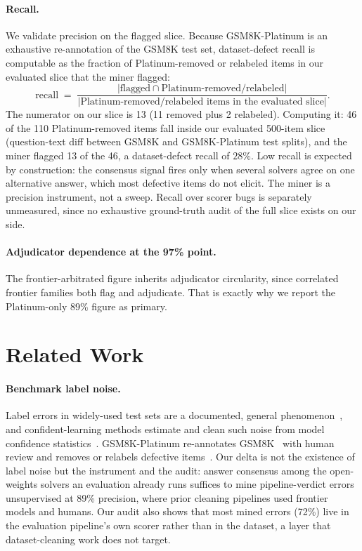\documentclass[11pt]{article}
\begin{document}
\paragraph{Recall.}
We validate precision on the flagged slice.
Because GSM8K-Platinum is an exhaustive re-annotation of the GSM8K test set, dataset-defect recall is computable as the fraction of Platinum-removed or relabeled items in our evaluated slice that the miner flagged:
\[
\text{recall} \;=\; \frac{\lvert \text{flagged} \cap \text{Platinum-removed/relabeled} \rvert}{\lvert \text{Platinum-removed/relabeled items in the evaluated slice} \rvert}.
\]
The numerator on our slice is 13 (11 removed plus 2 relabeled).
Computing it: 46 of the 110 Platinum-removed items fall inside our evaluated 500-item slice (question-text diff between GSM8K and GSM8K-Platinum test splits), and the miner flagged 13 of the 46, a dataset-defect recall of $28\%$.
Low recall is expected by construction: the consensus signal fires only when several solvers agree on one alternative answer, which most defective items do not elicit.
The miner is a precision instrument, not a sweep.
Recall over scorer bugs is separately unmeasured, since no exhaustive ground-truth audit of the full slice exists on our side.

\paragraph{Adjudicator dependence at the 97\% point.}
The frontier-arbitrated figure inherits adjudicator circularity, since correlated frontier families both flag and adjudicate.
That is exactly why we report the Platinum-only 89\% figure as primary.

\section{Related Work}

\paragraph{Benchmark label noise.}
Label errors in widely-used test sets are a documented, general phenomenon~\cite{pervasive}, and confident-learning methods estimate and clean such noise from model confidence statistics~\cite{confident}.
GSM8K-Platinum re-annotates GSM8K~\cite{gsm8k} with human review and removes or relabels defective items~\cite{platinum}.
Our delta is not the existence of label noise but the instrument and the audit: answer consensus among the open-weights solvers an evaluation already runs suffices to mine pipeline-verdict errors unsupervised at 89\% precision, where prior cleaning pipelines used frontier models and humans.
Our audit also shows that most mined errors (72\%) live in the evaluation pipeline's own scorer rather than in the dataset, a layer that dataset-cleaning work does not target.
\end{document}
